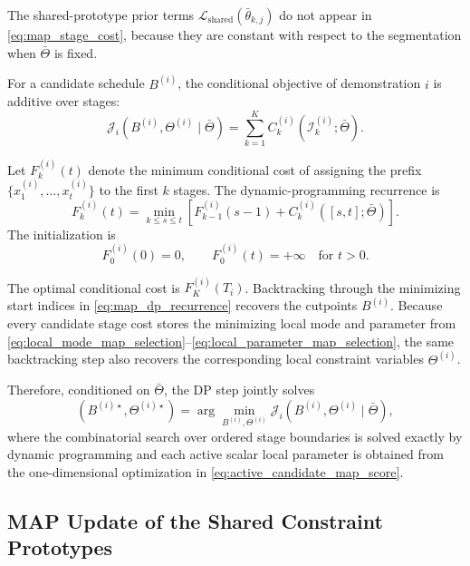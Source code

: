 \documentclass[lettersize,journal]{IEEEtran}
\begin{document}
The shared-prototype prior terms
$\mathcal{L}_{\mathrm{shared}}(\bar{\theta}_{k,j})$ do not appear in
\eqref{eq:map_stage_cost}, because they are constant with respect to the
segmentation when $\bar{\Theta}$ is fixed.

For a candidate schedule $B^{(i)}$, the conditional objective of demonstration
$i$ is additive over stages:
\begin{equation}
\mathcal{J}_i
\left(
B^{(i)},\Theta^{(i)}
\mid
\bar{\Theta}
\right)
=
\sum_{k=1}^{K}
C_k^{(i)}
\left(
\mathcal{I}_k^{(i)};
\bar{\Theta}
\right).
\label{eq:conditional_demo_map_objective}
\end{equation}

Let $F_k^{(i)}(t)$ denote the minimum conditional cost of assigning the prefix
$\{x_1^{(i)},\dots,x_t^{(i)}\}$ to the first $k$ stages. The dynamic-programming
recurrence is
\begin{equation}
F_k^{(i)}(t)
=
\min_{k\leq s\leq t}
\left[
F_{k-1}^{(i)}(s-1)
+
C_k^{(i)}
\left(
[s,t];
\bar{\Theta}
\right)
\right].
\label{eq:map_dp_recurrence}
\end{equation}
The initialization is
\[
F_0^{(i)}(0)=0,
\qquad
F_0^{(i)}(t)=+\infty
\quad
\text{for }t>0.
\]

The optimal conditional cost is $F_K^{(i)}(T_i)$. Backtracking through the
minimizing start indices in \eqref{eq:map_dp_recurrence} recovers the cutpoints
$B^{(i)}$. Because every candidate stage cost stores the minimizing local mode
and parameter from
\eqref{eq:local_mode_map_selection}--\eqref{eq:local_parameter_map_selection},
the same backtracking step also recovers the corresponding local constraint
variables $\Theta^{(i)}$.

Therefore, conditioned on $\bar{\Theta}$, the DP step jointly solves
\begin{equation}
\left(
B^{(i)\star},
\Theta^{(i)\star}
\right)
=
\arg\min_{B^{(i)},\Theta^{(i)}}
\mathcal{J}_i
\left(
B^{(i)},\Theta^{(i)}
\mid
\bar{\Theta}
\right),
\label{eq:conditional_local_map_problem}
\end{equation}
where the combinatorial search over ordered stage boundaries is solved exactly
by dynamic programming and each active scalar local parameter is obtained from
the one-dimensional optimization in
\eqref{eq:active_candidate_map_score}.


\subsection{MAP Update of the Shared Constraint Prototypes}
\label{subsec:shared_prototype_map_update}
\end{document}
